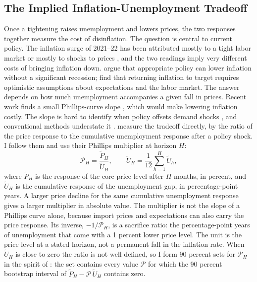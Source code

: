 \documentclass[11pt]{article}
\begin{document}
\subsection{The Implied Inflation-Unemployment Tradeoff}\label{sec:tradeoff}
Once a tightening raises unemployment and lowers prices, the two responses together measure the cost of disinflation. The question is central to current policy. The inflation surge of 2021--22 has been attributed mostly to a tight labor market \citep{benigno2023,ball2022} or mostly to shocks to prices \citep{blanchard2023}, and the two readings imply very different costs of bringing inflation down. \citet{benigno2023} argue that appropriate policy can lower inflation without a significant recession; \citet{ball2022} find that returning inflation to target requires optimistic assumptions about expectations and the labor market. The answer depends on how much unemployment accompanies a given fall in prices. Recent work finds a small Phillips-curve slope \citep{hazell2022,delnegro2020,ball2019,fitzgerald2024}, which would make lowering inflation costly. The slope is hard to identify when policy offsets demand shocks \citep{mcleay2020}, and conventional methods understate it \citep{barnichon2020}. \citet{barnichon2021} measure the tradeoff directly, by the ratio of the price response to the cumulative unemployment response after a policy shock. I follow them and use their Phillips multiplier at horizon $H$:
\begin{equation}
\mathcal{P}_H = \frac{\tilde P_H}{\tilde U_H}, \qquad \tilde U_H=\frac{1}{12}\sum_{h=1}^{H}\tilde U_h, \label{eq:pm}
\end{equation}
where $\tilde P_H$ is the response of the core price level after $H$ months, in percent, and $\tilde U_H$ is the cumulative response of the unemployment gap, in percentage-point years. A larger price decline for the same cumulative unemployment response gives a larger multiplier in absolute value. The multiplier is not the slope of a Phillips curve alone, because import prices and expectations can also carry the price response. Its inverse, $-1/\mathcal{P}_H$, is a sacrifice ratio: the percentage-point years of unemployment that come with a 1 percent lower price level. The unit is the price level at a stated horizon, not a permanent fall in the inflation rate. When $\tilde U_H$ is close to zero the ratio is not well defined, so I form 90 percent sets for $\mathcal{P}_H$ in the spirit of \citet{anderson1949}: the set contains every value $\mathcal{P}$ for which the 90 percent bootstrap interval of $\tilde P_H-\mathcal{P}\,\tilde U_H$ contains zero.
\end{document}
